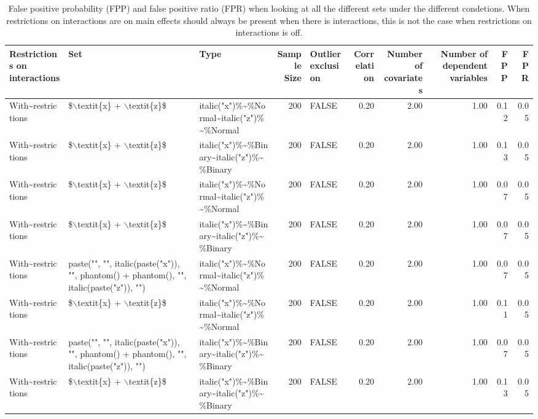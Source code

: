 \begin{longtable}{lllrlrrrrr}
\caption{False positive probability (FPP) and false positive ratio (FPR) when looking at all the different sets under the different condetions. When restrictions on interactions are on main effects should always be present when there is interactions, this is not the case when restrictions on interactions is off.} \\ 
  \hline
Restrictions on interactions & Set & Type & Sample Size & Outlier exclusion & Correlation & Number of covariates & Number of dependent variables & FPP & FPR \\ 
  \hline
With\~{}restrictions & \$$\backslash$textit\{x\} + $\backslash$textit\{z\}\$ & italic("x")\%\~{}\%Normal\~{}italic("z")\%\~{}\%Normal & 200 & FALSE & 0.20 & 2.00 & 1.00 & 0.12 & 0.05 \\ 
  With\~{}restrictions & \$$\backslash$textit\{x\} + $\backslash$textit\{z\}\$ & italic("x")\%\~{}\%Binary\~{}italic("z")\%\~{}\%Binary & 200 & FALSE & 0.20 & 2.00 & 1.00 & 0.13 & 0.05 \\ 
  With\~{}restrictions & \$$\backslash$textit\{x\} + $\backslash$textit\{z\}\$ & italic("x")\%\~{}\%Normal\~{}italic("z")\%\~{}\%Normal & 200 & FALSE & 0.20 & 2.00 & 1.00 & 0.07 & 0.05 \\ 
  With\~{}restrictions & \$$\backslash$textit\{x\} + $\backslash$textit\{z\}\$ & italic("x")\%\~{}\%Binary\~{}italic("z")\%\~{}\%Binary & 200 & FALSE & 0.20 & 2.00 & 1.00 & 0.07 & 0.05 \\ 
  With\~{}restrictions & paste("", "", italic(paste("x")), "", phantom() + phantom(), "", italic(paste("z")), "") & italic("x")\%\~{}\%Normal\~{}italic("z")\%\~{}\%Normal & 200 & FALSE & 0.20 & 2.00 & 1.00 & 0.07 & 0.05 \\ 
  With\~{}restrictions & \$$\backslash$textit\{x\} + $\backslash$textit\{z\}\$ & italic("x")\%\~{}\%Normal\~{}italic("z")\%\~{}\%Normal & 200 & FALSE & 0.20 & 2.00 & 1.00 & 0.11 & 0.05 \\ 
  With\~{}restrictions & paste("", "", italic(paste("x")), "", phantom() + phantom(), "", italic(paste("z")), "") & italic("x")\%\~{}\%Binary\~{}italic("z")\%\~{}\%Binary & 200 & FALSE & 0.20 & 2.00 & 1.00 & 0.07 & 0.05 \\ 
  With\~{}restrictions & \$$\backslash$textit\{x\} + $\backslash$textit\{z\}\$ & italic("x")\%\~{}\%Binary\~{}italic("z")\%\~{}\%Binary & 200 & FALSE & 0.20 & 2.00 & 1.00 & 0.13 & 0.05 \\ 

\end{longtable}
